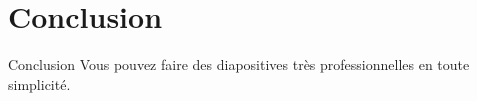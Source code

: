 \documentclass[utf8,compress]{beamer}
\begin{document}
%
%
\section{Conclusion}

\begin{frame}{Conclusion}
    Vous pouvez faire des diapositives très professionnelles en toute simplicité.
\end{frame}
\end{document}
